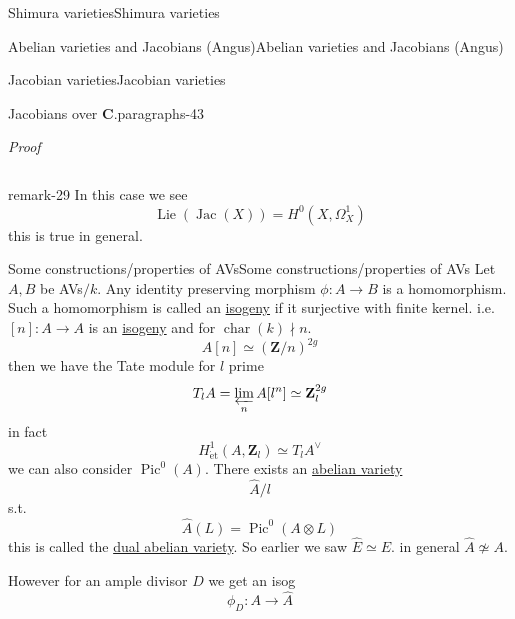 \documentclass[10pt,]{book}
\makeatletter
\renewcommand*{\proofname}{Proof}
\renewenvironment{proof}[1][\proofname]{\par
  \pushQED{\qed}%
  \normalfont \topsep6\p@\@plus6\p@\relax
  \trivlist
  \item\relax
    {\itshape
    #1\@addpunct{.}}\hspace\labelsep\ignorespaces
}{%
  \popQED\endtrivlist\@endpefalse
}
\numberwithin{equation}{section}
\newcommand{\Lie}{\operatorname{Lie}}
\newcommand{\lb}{[}
\newcommand{\rb}{]}
\newcommand{\ZZ}{\mathbf{Z}}
\newcommand{\CC}{\mathbf{C}}
\newcommand{\et}{\mathrm{\acute{e}t}}
\DeclareMathOperator{\Pic}{Pic}
\DeclareMathOperator{\Jac}{Jac}
\DeclareMathOperator{\characteristic}{char}
\makeatother
\begin{document}
\begin{chapterptx}{Shimura varieties}{}{Shimura varieties}{}{}
\begin{sectionptx}{Abelian varieties and Jacobians (Angus)}{}{Abelian varieties and Jacobians (Angus)}{}{}
\begin{subsectionptx}{Jacobian varieties}{}{Jacobian varieties}{}{}
\begin{paragraphs}{Jacobians over \(\CC\).}{paragraphs-43}
\begin{proof}
\begin{equation*}
\end{equation*}
%
\end{proof}
\begin{remark}{}{remark-29}%
\hypertarget{p-1109}{}%
In this case we see%
\begin{equation*}
\Lie(\Jac(X)) = H^0(X, \Omega_X^1)
\end{equation*}
this is true in general.%
\end{remark}
\end{paragraphs}%
\end{subsectionptx}
%
%
\typeout{************************************************}
\typeout{************************************************}
%
\begin{subsectionptx}{Some constructions/properties of AVs}{}{Some constructions/properties of AVs}{}{}\label{subsection-79}
\hypertarget{p-1110}{}%
Let \(A,B\) be AVs\(/k\). Any identity preserving morphism \(\phi \colon A \to B\) is a homomorphism. Such a homomorphism is called an \hyperref[def-supersing-isog-isog]{isogeny} if it surjective with finite kernel. i.e. \(\lb n \rb \colon A \to A\) is an \hyperref[def-supersing-isog-isog]{isogeny} and for \(\characteristic(k) \nmid n\).%
\begin{equation*}
A[n] \simeq (\ZZ/n)^{2g}
\end{equation*}
then we have the Tate module for \(l\) prime%
\begin{equation*}
T_lA = \varprojlim_n A[l^n] \simeq \ZZ_l^{2g}
\end{equation*}
in fact%
\begin{equation*}
H^1_{\et} (A, \ZZ_l) \simeq T_lA ^\vee
\end{equation*}
we can also consider \(\Pic^0(A)\). There exists an \hyperref[def-buntes-abvar]{abelian variety}%
\begin{equation*}
\hat A/l
\end{equation*}
s.t.%
\begin{equation*}
\hat A (L) = \Pic^0(A \otimes L)
\end{equation*}
this is called the \hyperref[def-dual-abvar]{dual abelian variety}. So earlier we saw \(\hat E \simeq E\). in general \(\hat A \not \simeq  A\).%
\par
\hypertarget{p-1111}{}%
However for an ample divisor \(D\) we get an isog%
\begin{equation*}
\phi_D \colon A \to \hat A
\end{equation*}
%
\begin{equation*}

\end{equation*}
\end{subsectionptx}
\end{sectionptx}
\end{chapterptx}
\end{document}
